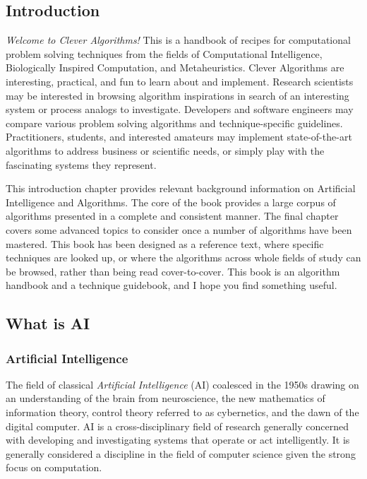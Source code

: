 


\begin{bibunit}

\chapter{Introduction}
\label{chap:intro}
\emph{Welcome to Clever Algorithms!} This is a handbook of recipes for computational problem solving techniques from the fields of Computational Intelligence, Biologically Inspired Computation, and Metaheuristics. 
Clever Algorithms are interesting, practical, and fun to learn about and implement.
Research scientists may be interested in browsing algorithm inspirations in search of an interesting system or process analogs to investigate. Developers and software engineers may compare various problem solving algorithms and technique-specific guidelines. Practitioners, students, and interested amateurs may implement state-of-the-art algorithms to address business or scientific needs, or simply play with the fascinating systems they represent.

This introduction chapter provides relevant background information on Artificial Intelligence and Algorithms. The core of the book provides a large corpus of algorithms presented in a complete and consistent manner. The final chapter covers some advanced topics to consider once a number of algorithms have been mastered. This book has been designed as a reference text, where specific techniques are looked up, or where the algorithms across whole fields of study can be browsed, rather than being read cover-to-cover. This book is an algorithm handbook and a technique guidebook, and I hope you find something useful.


% 
% 
\section{What is AI}
\label{intro:sec:what_is_ai}
% 
% 
\subsection{Artificial Intelligence}
\label{sec:artificial_intelligence}
The field of classical \emph{Artificial Intelligence} (AI) coalesced in the 1950s drawing on an understanding of the brain from neuroscience, the new mathematics of information theory, control theory referred to as cybernetics, and the dawn of the digital computer. AI is a cross-disciplinary field of research generally concerned with developing and investigating systems that operate or act intelligently. It is generally considered a discipline in the field of computer science given the strong focus on computation.


\end{bibunit}
